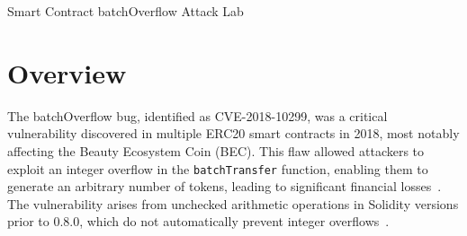 

\newcommand{\commonfolder}{../../common-files}




\setlength{\headheight}{13.6pt}



\newcommand{\pointupright}[1]{\ding{218} \textbf{\texttt{#1}}}



\begin{center}
{\LARGE Smart Contract batchOverflow Attack Lab}
\end{center}


\section{Overview}

The batchOverflow bug, identified as CVE-2018-10299, was a critical vulnerability discovered in multiple ERC20 smart contracts in 2018, most notably affecting the Beauty Ecosystem Coin (BEC). This flaw allowed attackers to exploit an integer overflow in the \texttt{batchTransfer} function, enabling them to generate an arbitrary number of tokens, leading to significant financial losses~\cite{PeckShield2018}. The vulnerability arises from unchecked arithmetic operations in Solidity versions prior to 0.8.0, which do not automatically prevent integer overflows~\cite{CVE-2018-10299}.

